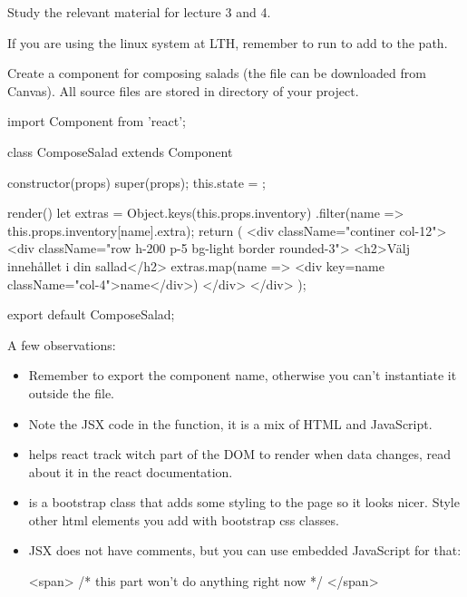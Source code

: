 \documentclass[fleqn, article, a4paper]{memoir}
\begin{document}
\begin{Assignments}

\item Study the relevant material for lecture 3 and 4.

\item If you are using the linux system at LTH, remember to run  to add  to the path.

\item Create a component for composing salads (the file can be downloaded from Canvas). All source files are stored in  directory of your project.
\begin{Code}
import { Component } from 'react';

class ComposeSalad extends Component {
  constructor(props) {
    super(props);
    this.state = {};
  }

  render() {
    let extras = Object.keys(this.props.inventory)
                 .filter(name => this.props.inventory[name].extra);
    return (
      <div className="continer col-12">
      <div className="row h-200 p-5 bg-light border rounded-3">
        <h2>Välj innehållet i din sallad</h2>
          {extras.map(name => <div key={name} className="col-4">{name}</div>)}
      </div>
    </div>
    );
  }

}
export default ComposeSalad;\end{Code}

\noindent A few observations:
\begin{itemize}
  \item Remember to export the component name, otherwise you can't instantiate it outside the file.
  \item Note the JSX code in the  function, it is a mix of HTML and JavaScript.
   \item {} helps react track witch part of the DOM to render when data changes, read about it in the react documentation.
   \item {} is a bootstrap class that adds some styling to the page so it looks nicer. Style other html elements you add with bootstrap css classes.
   \item JSX does not have comments, but you can use embedded JavaScript for that:
\begin{Code}
<span>  {/* this part won't do anything right now */}  </span>
\end{Code}
\end{itemize}


\end{Assignments}
\end{document}
